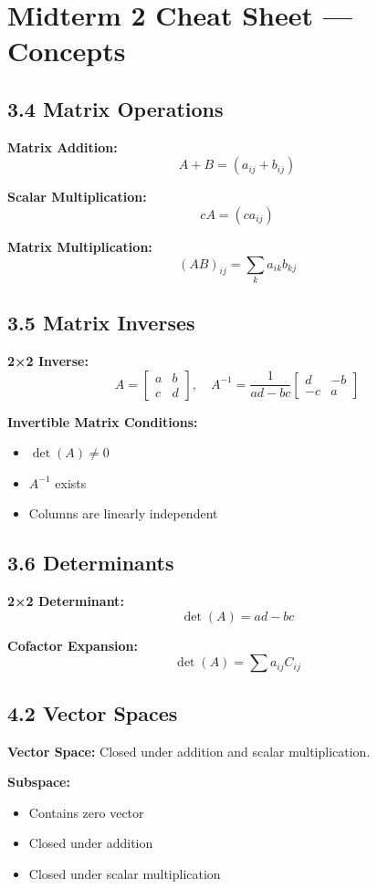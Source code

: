 \documentclass[10pt]{article}
\begin{document}
\small

\section*{Midterm 2 Cheat Sheet — Concepts}

\subsection*{3.4 Matrix Operations}
\textbf{Matrix Addition:}
\[
A + B = (a_{ij} + b_{ij})
\]

\textbf{Scalar Multiplication:}
\[
cA = (c a_{ij})
\]

\textbf{Matrix Multiplication:}
\[
(AB)_{ij} = \sum_{k} a_{ik} b_{kj}
\]

\subsection*{3.5 Matrix Inverses}
\textbf{2×2 Inverse:}
\[
A = \begin{bmatrix} a & b \\ c & d \end{bmatrix}, \quad
A^{-1} = \frac{1}{ad - bc}
\begin{bmatrix} d & -b \\ -c & a \end{bmatrix}
\]

\textbf{Invertible Matrix Conditions:}
\begin{itemize}
\item $\det(A) \neq 0$
\item $A^{-1}$ exists
\item Columns are linearly independent
\end{itemize}

\subsection*{3.6 Determinants}
\textbf{2×2 Determinant:}
\[
\det(A) = ad - bc
\]

\textbf{Cofactor Expansion:}
\[
\det(A) = \sum a_{ij} C_{ij}
\]

\subsection*{4.2 Vector Spaces}
\textbf{Vector Space:}
Closed under addition and scalar multiplication.

\textbf{Subspace:}
\begin{itemize}
\item Contains zero vector
\item Closed under addition
\item Closed under scalar multiplication
\end{itemize}
\end{document}
